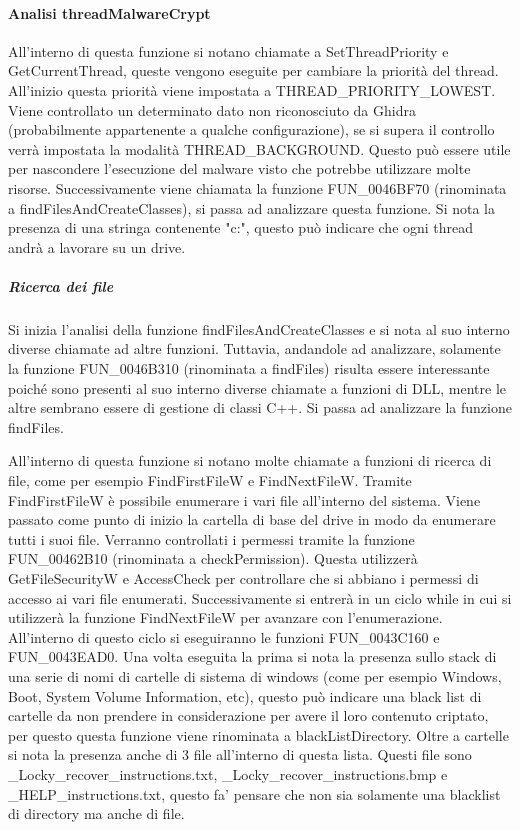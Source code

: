 \documentclass[a4paper,12pt]{article}
\begin{document}
\paragraph{Analisi threadMalwareCrypt}
All'interno di questa funzione si notano chiamate a SetThreadPriority e GetCurrentThread, queste vengono eseguite per cambiare la priorità del thread. All'inizio questa priorità viene impostata a THREAD\_PRIORITY\_LOWEST. Viene controllato un determinato dato non riconosciuto da Ghidra (probabilmente appartenente a qualche configurazione), se si supera il controllo verrà impostata la modalità THREAD\_BACKGROUND. Questo può essere utile per nascondere l'esecuzione del malware visto che potrebbe utilizzare molte risorse. Successivamente viene chiamata la funzione FUN\_0046BF70 (rinominata a findFilesAndCreateClasses), si passa ad analizzare questa funzione. Si nota la presenza di una stringa contenente "c:", questo può indicare che ogni thread andrà a lavorare su un drive. 

\subparagraph{Ricerca dei file}
Si inizia l'analisi della funzione findFilesAndCreateClasses e si nota al suo interno diverse chiamate ad altre funzioni. Tuttavia, andandole ad analizzare, solamente la funzione FUN\_0046B310 (rinominata a findFiles) risulta essere interessante poiché sono presenti al suo interno diverse chiamate a funzioni di DLL, mentre le altre sembrano essere di gestione di classi C++. Si passa ad analizzare la funzione findFiles.

All'interno di questa funzione si notano molte chiamate a funzioni di ricerca di file, come per esempio FindFirstFileW e FindNextFileW. Tramite FindFirstFileW è possibile enumerare i vari file all'interno del sistema. Viene passato come punto di inizio la cartella di base del drive in modo da enumerare tutti i suoi file. Verranno controllati i permessi tramite la funzione FUN\_00462B10 (rinominata a checkPermission). Questa utilizzerà GetFileSecurityW e AccessCheck per controllare che si abbiano i permessi di accesso ai vari file enumerati. Successivamente si entrerà in un ciclo while in cui si utilizzerà la funzione FindNextFileW per avanzare con l'enumerazione. All'interno di questo ciclo si eseguiranno le funzioni FUN\_0043C160 e FUN\_0043EAD0. Una volta eseguita la prima si nota la presenza sullo stack di una serie di nomi di cartelle di sistema di windows (come per esempio Windows, Boot, System Volume Information, etc), questo può indicare una black list di cartelle da non prendere in considerazione per avere il loro contenuto criptato, per questo questa funzione viene rinominata a blackListDirectory. Oltre a cartelle si nota la presenza anche di 3 file all'interno di questa lista. Questi file sono \_Locky\_recover\_instructions.txt, \_Locky\_recover\_instructions.bmp e \_HELP\_instructions.txt, questo fa' pensare che non sia solamente una blacklist di directory ma anche di file.
\end{document}
